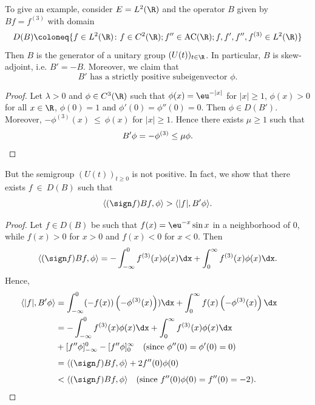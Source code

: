 To give an example, consider $E = L^{2}(\R)$ and the operator $B$ given by 
$Bf = f^{(3)}$ with domain
\[
D(B) \coloneq \{f \in L^{2}(\R) \colon f \in C^{2}(\R); f'' \in \text{AC}(\R) ; f,f',f'',f^{(3)} \in L^{2}(\R)\}
\]
Then $B$ is the generator of a unitary group $(U(t))_{t \in \R}$. 
In particular, $B$ is skew-adjoint, i.e. $B' = -B$.
Moreover, we claim that
\begin{equation}\label{eq:c2-3.18}
B' \text{ has a strictly positive subeigenvector } \phi.
\end{equation}
\begin{proof}
Let $\lambda > 0$ and $\phi \in C^{3}(\R)$ such that $\phi(x) = \eu^{-|x|}$ for
$|x| \geq 1$, $\phi(x) > 0$ for all $x \in \R$, $\phi(0) = 1$ and $\phi'(0) = \phi''(0) = 0$.
Then $\phi \in D(B')$. 
Moreover, $-\phi^{(3)}(x)~\leq~\phi(x)$ for $|x| \geq 1$. 
Hence there exists $\mu \geq 1$ such that
%
\[
	B'\phi = -\phi^{(3)} \leq \mu\phi.
\qedhere
\]
\end{proof}
But the semigroup $(U(t))_{t \geq 0}$ is not positive. 
In fact, we show that there exists $f~\in~D(B)$ such that
\begin{equation}\label{eq:c2-3.19}
\langle(\sign  f)Bf,\phi\rangle > \langle|f|,B'\phi\rangle.
\end{equation}
\begin{proof}
Let $f \in D(B)$ be such that $f(x) = \eu^{-x} \sin x$ in a neighborhood of\/ $0$, while $f(x) > 0$ for $x > 0$ and $f(x) < 0$ for $x < 0$. 
Then
\begin{align*}
\langle(\sign  f)Bf,\phi\rangle = - \int_{-\infty}^{0} f^{(3)}(x)\phi(x) \dx + \int_{0}^{\infty} f^{(3)}(x)\phi(x) \dx.
\end{align*}
Hence, 
\begin{align*}
\langle|f|,B'\phi\rangle &= \int_{-\infty}^{0} (-f(x))\left(-\phi^{(3)}(x)\right)) \dx + \int_{0}^{\infty} f(x)\left(-\phi^{(3)}(x)\right) \dx\\
&= - \int_{-\infty}^{0} f^{(3)}(x)\phi(x) \dx + \int_{0}^{\infty} f^{(3)}(x)\phi(x) \dx\\
&+ [f''\phi]_{-\infty}^{0} - [f''\phi]_{0}^{\infty} \quad \text{(since $\phi''(0)=\phi'(0)=0$)}\\[1ex]
&= \langle(\sign  f) Bf,\phi\rangle + 2f''(0)\phi(0)\\[1ex]
&< \langle(\sign  f) Bf,\phi\rangle \quad \text{(since $f''(0)\phi(0) = f''(0) = -2$)}.
&&\qedhere
\end{align*}
\end{proof}
